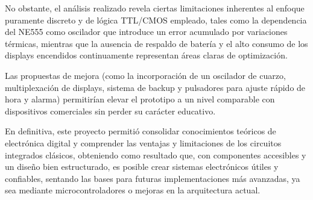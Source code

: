 \documentclass[12pt,letterpaper]{article}
\begin{document}
\indent No obstante, el análisis realizado revela ciertas limitaciones inherentes al enfoque puramente discreto y de lógica TTL/CMOS empleado, tales como la dependencia del NE555 como oscilador que introduce un error acumulado por variaciones térmicas, mientras que la ausencia de respaldo de batería y el alto consumo de los displays encendidos continuamente representan áreas claras de optimización. 

\indent Las propuestas de mejora (como la incorporación de un oscilador de cuarzo, multiplexación de displays, sistema de backup y pulsadores para ajuste rápido de hora y alarma) permitirían elevar el prototipo a un nivel comparable con dispositivos comerciales sin perder su carácter educativo.

\indent En definitiva, este proyecto permitió consolidar conocimientos teóricos de electrónica digital y comprender las ventajas y limitaciones de los circuitos integrados clásicos, obteniendo como resultado que, con componentes accesibles y un diseño bien estructurado, es posible crear sistemas electrónicos útiles y confiables, sentando las bases para futuras implementaciones más avanzadas, ya sea mediante microcontroladores o mejoras en la arquitectura actual.
\end{document}
